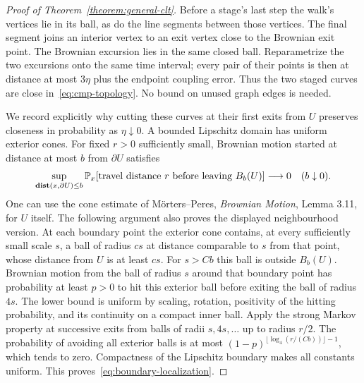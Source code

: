 \documentclass[12pt]{amsart}
\numberwithin{equation}{section}
\DeclareMathOperator{\dist}{\mathop{\bf dist{}}}
\renewcommand*{\P}{\mathbb P}
\begin{document}
\begin{proof}[Proof of Theorem~\ref{theorem:general-clt}]
Before a stage's last step the walk's vertices lie in its ball, as do the line segments between those vertices. The final segment joins an interior vertex to an exit vertex close to the Brownian exit point. The Brownian excursion lies in the same closed ball. Reparametrize the two excursions onto the same time interval; every pair of their points is then at distance at most $3\eta$ plus the endpoint coupling error. Thus the two staged curves are close in~\eqref{eq:cmp-topology}. No bound on unused graph edges is needed.

We record explicitly why cutting these curves at their first exits from $U$ preserves closeness in probability as $\eta\downarrow0$. A bounded Lipschitz domain has uniform exterior cones. For fixed $r>0$ sufficiently small, Brownian motion started at distance at most $b$ from $\partial U$ satisfies
\begin{equation}\label{eq:boundary-localization}
 \sup_{\dist(x,\partial U)\leq b}
 \P_x[\text{travel distance }r\text{ before leaving }B_b(U)]\longrightarrow0
 \quad(b\downarrow0).
\end{equation}
One can use the cone estimate of M\"orters--Peres, \emph{Brownian Motion}, Lemma 3.11, for $U$ itself. The following argument also proves the displayed neighbourhood version. At each boundary point the exterior cone contains, at every sufficiently small scale $s$, a ball of radius $c s$ at distance comparable to $s$ from that point, whose distance from $U$ is at least $c s$. For $s>C b$ this ball is outside $B_b(U)$. Brownian motion from the ball of radius $s$ around that boundary point has probability at least $p>0$ to hit this exterior ball before exiting the ball of radius $4s$. The lower bound is uniform by scaling, rotation, positivity of the hitting probability, and its continuity on a compact inner ball. Apply the strong Markov property at successive exits from balls of radii $s,4s,\ldots$ up to radius $r/2$. The probability of avoiding all exterior balls is at most $(1-p)^{\lfloor\log_4(r/(Cb))\rfloor-1}$, which tends to zero. Compactness of the Lipschitz boundary makes all constants uniform. This proves~\eqref{eq:boundary-localization}.


\end{proof}
\end{document}
